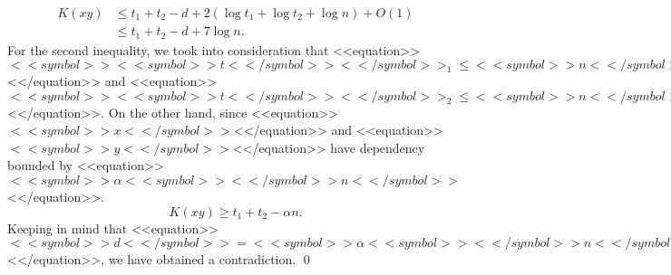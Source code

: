 \documentclass[proceedings]{stacs}
\begin{document}
\[
\begin{array}{ll}
K(xy) & \leq t_1 + t_2 - d + 2 (\log t_1 + \log t_2 + \log n ) + O(1) \\
& \leq t_1 + t_2 - d + 7 \log n.
\end{array}
\]
For the second inequality, we took into consideration that <<equation>>$<<symbol>><<symbol>>t<</symbol>><</symbol>>_1 \leq <<symbol>>n<</symbol>>$<</equation>> and <<equation>>$<<symbol>><<symbol>>t<</symbol>><</symbol>>_2 \leq <<symbol>>n<</symbol>>$<</equation>>. On the other hand, since <<equation>>$<<symbol>>x<</symbol>>$<</equation>> and <<equation>>$<<symbol>>y<</symbol>>$<</equation>> have dependency bounded by <<equation>>$<<symbol>>\alpha <<symbol>><</symbol>>n<</symbol>>$<</equation>>.
\[
K(xy) \geq t_1 + t_2 - \alpha n.
\]
Keeping in mind that <<equation>>$<<symbol>>d<</symbol>> = <<symbol>>\alpha <<symbol>><</symbol>>n<</symbol>> + 8 \log <<symbol>>n<</symbol>>$<</equation>>, we have obtained a contradiction.
\qed
\end{document}
